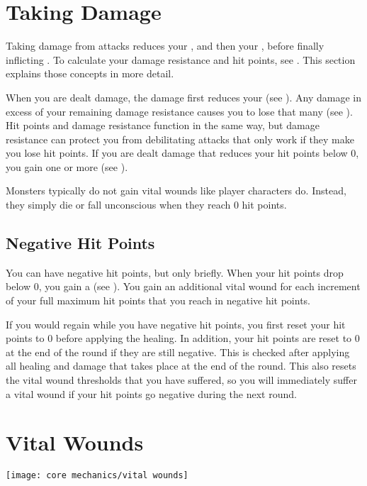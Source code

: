 \section{Taking Damage}\label{Taking Damage}
    Taking damage from attacks reduces your , and then your , before finally inflicting .
    To calculate your damage resistance and hit points, see .
    This section explains those concepts in more detail.

    When you are dealt damage, the damage first reduces your  (see ).
    Any damage in excess of your remaining damage resistance causes you to lose that many  (see ).
    Hit points and damage resistance function in the same way, but damage resistance can protect you from debilitating attacks that only work if they make you lose hit points.
    If you are dealt damage that reduces your hit points below 0, you gain one or more  (see ).

    Monsters typically do not gain vital wounds like player characters do.
    Instead, they simply die or fall unconscious when they reach 0 hit points.

    \subsection{Negative Hit Points}\label{Negative Hit Points}
        You can have negative hit points, but only briefly.
        When your hit points drop below 0, you gain a  (see ).
        You gain an additional vital wound for each increment of your full maximum hit points that you reach in negative hit points.

        If you would regain  while you have negative hit points, you first reset your hit points to 0 before applying the healing.
        In addition, your hit points are reset to 0 at the end of the round if they are still negative.
        This is checked after applying all healing and damage that takes place at the end of the round.
        This also resets the vital wound thresholds that you have suffered, so you will immediately suffer a vital wound if your hit points go negative during the next round.

\section{Vital Wounds}\label{Vital Wounds}
    \texttt{[image: core mechanics/vital wounds]}

